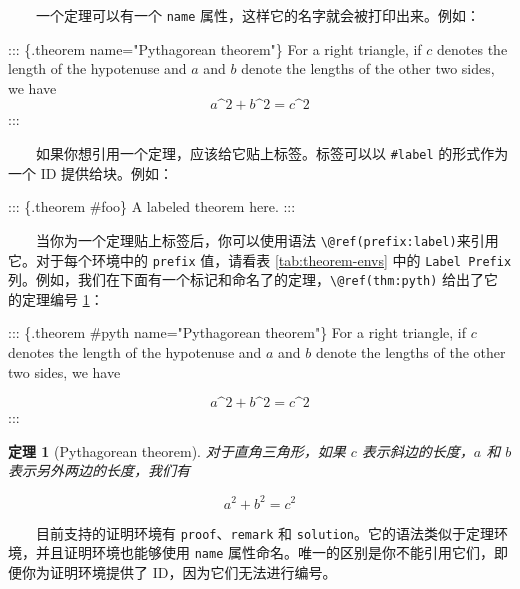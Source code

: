 \documentclass[
  12pt,
]{krantz}
\newenvironment{Shaded}{\begin{snugshade}}{\end{snugshade}}
\newcommand{\NormalTok}[1]{#1}
\newtheorem{theorem}{定理}[chapter]
\theoremstyle{definition}
\theoremstyle{definition}
\theoremstyle{definition}
\theoremstyle{definition}
\theoremstyle{remark}
\begin{document}
  一个定理可以有一个 \texttt{name} 属性，这样它的名字就会被打印出来。例如：

\begin{Shaded}
\begin{Highlighting}[]
\NormalTok{::: \{.theorem name="Pythagorean theorem"\}}
\NormalTok{For a right triangle, if $c$ denotes the length of the hypotenuse}
\NormalTok{and $a$ and $b$ denote the lengths of the other two sides, we have}
\NormalTok{$$a\^{}2 + b\^{}2 = c\^{}2$$}
\NormalTok{:::}
\end{Highlighting}
\end{Shaded}

  如果你想引用一个定理，应该给它贴上标签。标签可以以 \texttt{\#label} 的形式作为一个 ID 提供给块。例如：

\begin{Shaded}
\begin{Highlighting}[]
\NormalTok{::: \{.theorem \#foo\}}
\NormalTok{A labeled theorem here.}
\NormalTok{:::}
\end{Highlighting}
\end{Shaded}

  当你为一个定理贴上标签后，你可以使用语法 \texttt{\textbackslash{}@ref(prefix:label)}来引用它。对于每个环境中的 \texttt{prefix} 值，请看表 \ref{tab:theorem-envs} 中的 \texttt{Label\ Prefix} 列。例如，我们在下面有一个标记和命名了的定理，\texttt{\textbackslash{}@ref(thm:pyth)} 给出了它的定理编号 \ref{thm:pyth}：

\begin{Shaded}
\begin{Highlighting}[]
\NormalTok{::: \{.theorem \#pyth name="Pythagorean theorem"\}}
\NormalTok{For a right triangle, if $c$ denotes the length of the hypotenuse}
\NormalTok{and $a$ and $b$ denote the lengths of the other two sides, we have}

\NormalTok{$$a\^{}2 + b\^{}2 = c\^{}2$$}
\NormalTok{:::}
\end{Highlighting}
\end{Shaded}

\begin{theorem}[Pythagorean theorem]
\protect\hypertarget{thm:pyth}{}\label{thm:pyth}对于直角三角形，如果 \(c\) 表示斜边的长度，\(a\) 和 \(b\) 表示另外两边的长度，我们有

\[a^2 + b^2 = c^2\]
\end{theorem}

  目前支持的证明环境有 \texttt{proof}、\texttt{remark} 和 \texttt{solution}。它的语法类似于定理环境，并且证明环境也能够使用 \texttt{name} 属性命名。唯一的区别是你不能引用它们，即便你为证明环境提供了 ID，因为它们无法进行编号。
\end{document}
